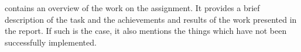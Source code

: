 contains an overview of the work on the assignment.
It provides a brief description of the task and the achievements and results of the work presented in the report.
If such is the case, it also mentions the things which have not been successfully implemented.